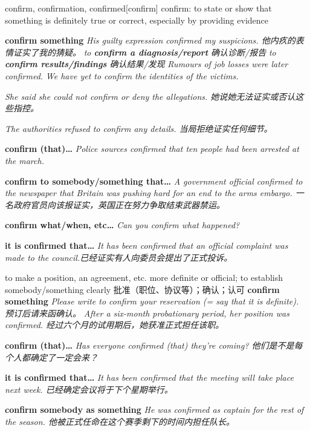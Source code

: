 \begin{DefWord}{confirm, confirmation, confirmed}[confirm]
    confirm: to state or show that something is definitely true or correct, especially by providing evidence

    \textbf{confirm something} \textit{His guilty expression confirmed my suspicions. 他内疚的表情证实了我的猜疑。}
    \textit{to \textbf{confirm a diagnosis/report} 确认诊断/报告}
    \textit{to \textbf{confirm results/findings} 确认结果/发现}
    \textit{Rumours of job losses were later confirmed.}
    \textit{We have yet to confirm the identities of the victims.}

    \textit{She said she could not confirm or deny the allegations. 她说她无法证实或否认这些指控。}

    \textit{The authorities refused to confirm any details. 当局拒绝证实任何细节。}

    \textbf{confirm (that)… } \textit{Police sources confirmed that ten people had been arrested at the march.}
    
    \textbf{confirm to somebody/something that…} \textit{A government official confirmed to the newspaper that Britain was pushing hard for an end to the arms embargo. 一名政府官员向该报证实，英国正在努力争取结束武器禁运。}

    \textbf{confirm what/when, etc…} \textit{Can you confirm what happened?}

    \textbf{it is confirmed that…} 
    \textit{It has been confirmed that an official complaint was made to the council.已经证实有人向委员会提出了正式投诉。}

    to make a position, an agreement, etc. more definite or official; to establish somebody/something clearly 批准（职位、协议等）；确认；认可
    \textbf{confirm something} \textit{Please write to confirm your reservation (= say that it is definite). 预订后请来函确认。}
    \textit{After a six-month probationary period, her position was confirmed. 经过六个月的试用期后，她获准正式担任该职。}

    \textbf{confirm (that)…} \textit{Has everyone confirmed (that) they're coming? 他们是不是每个人都确定了一定会来？}

    \textbf{it is confirmed that…} \textit{It has been confirmed that the meeting will take place next week. 已经确定会议将于下个星期举行。}

    \textbf{confirm somebody as something} \textit{He was confirmed as captain for the rest of the season. 他被正式任命在这个赛季剩下的时间内担任队长。}


\end{DefWord}
